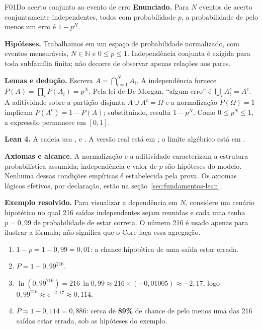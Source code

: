\begin{formalizacao}{F01}{Do acerto conjunto ao evento de erro}
\textbf{Enunciado.} Para $N$ eventos de acerto conjuntamente independentes, todos com probabilidade $p$, a probabilidade de pelo menos um erro é $1-p^N$.

\textbf{Hipóteses.} Trabalhamos em um espaço de probabilidade normalizado, com eventos mensuráveis, $N\in\mathbb N$ e $0\leq p\leq1$. Independência conjunta é exigida para toda subfamília finita; não decorre de observar apenas relações aos pares.

\textbf{Lemas e dedução.} Escreva $A=\bigcap_{i=1}^N A_i$. A independência fornece $P(A)=\prod_i P(A_i)=p^N$. Pela lei de De Morgan, ``algum erro'' é $\bigcup_i A_i^c=A^c$. A aditividade sobre a partição disjunta $A\cup A^c=\Omega$ e a normalização $P(\Omega)=1$ implicam $P(A^c)=1-P(A)$; substituindo, resulta $1-p^N$. Como $0\leq p^N\leq1$, a expressão permanece em $[0,1]$.

\textbf{Lean 4.} A cadeia usa ,  e . A versão real está em ; o limite algébrico está em .

\textbf{Axiomas e alcance.} A normalização e a aditividade caracterizam a estrutura probabilística assumida; independência e valor de $p$ são hipóteses do modelo. Nenhuma dessas condições empíricas é estabelecida pela prova. Os axiomas lógicos efetivos, por declaração, estão na seção~\ref{sec:fundamentos-lean}.
\end{formalizacao}

\begin{resultado}
\textbf{Exemplo resolvido.} Para visualizar a dependência em $N$, considere um
cenário hipotético no qual 216 saídas independentes sejam reunidas e cada uma tenha
$p = 0{,}99$ de probabilidade de estar correta. O número 216 é usado apenas para
ilustrar a fórmula; não significa que o Core faça essa agregação.
\begin{enumerate}[leftmargin=1.4em,itemsep=2pt]
  \item $1 - p = 1 - 0{,}99 = 0{,}01$: a chance hipotética de uma saída estar errada.
  \item $P = 1 - 0{,}99^{216}$.
  \item $\ln(0{,}99^{216}) = 216\,\ln 0{,}99 \approx 216 \times (-0{,}01005) \approx -2{,}17$,
        logo $0{,}99^{216} \approx e^{-2{,}17} \approx 0{,}114$.
  \item $P \approx 1 - 0{,}114 = 0{,}886$: cerca de \textbf{89\%} de chance de
        pelo menos uma das 216 saídas estar errada, sob as hipóteses do exemplo.
\end{enumerate}
\end{resultado}

